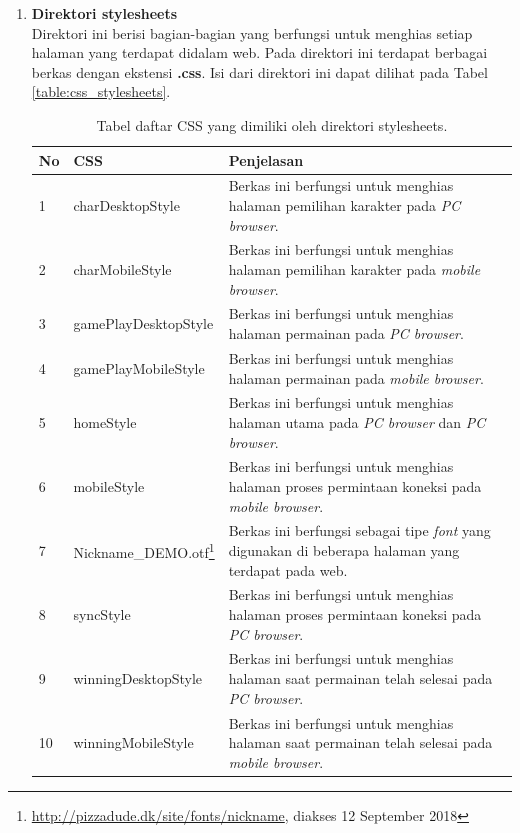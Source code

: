 \begin{enumerate}
\begin{enumerate}
\begin{enumerate}
		\end{enumerate}
		\item \textbf{Direktori stylesheets} \\ 
		Direktori ini berisi bagian-bagian yang berfungsi untuk menghias setiap halaman yang terdapat didalam web. Pada direktori ini terdapat berbagai berkas dengan ekstensi \textbf{.css}. Isi dari direktori ini dapat dilihat pada Tabel \ref{table:css_stylesheets}.
		\begin{table}[H]
			\centering
			\caption{Tabel daftar CSS yang dimiliki oleh direktori stylesheets.}
			\begin{tabular}{|p{0.35cm}|p{3cm}|p{7cm}|}
				\hline
				No & CSS & Penjelasan \\ \hline
				1 & charDesktopStyle & Berkas ini berfungsi untuk menghias halaman pemilihan karakter pada \textit{PC browser}. \\ \hline
				2 & charMobileStyle & Berkas ini berfungsi untuk menghias halaman pemilihan karakter pada \textit{mobile browser}. \\ \hline
				3 & gamePlayDesktopStyle & Berkas ini berfungsi untuk menghias halaman permainan pada \textit{PC browser}. \\ \hline
				4 & gamePlayMobileStyle & Berkas ini berfungsi untuk menghias halaman permainan pada \textit{mobile browser}. \\ \hline
				5 & homeStyle & Berkas ini berfungsi untuk menghias halaman utama pada \textit{PC browser} dan \textit{PC browser}. \\ \hline
				6 & mobileStyle & Berkas ini berfungsi untuk menghias halaman proses permintaan koneksi pada \textit{mobile browser}. \\ \hline
				7 & Nickname\_DEMO.otf\footnote{\url{http://pizzadude.dk/site/fonts/nickname}, diakses 12 September 2018} & Berkas ini berfungsi sebagai tipe \textit{font} yang digunakan di beberapa halaman yang terdapat pada web. \\ \hline
				8 & syncStyle & Berkas ini berfungsi untuk menghias halaman proses permintaan koneksi pada \textit{PC browser}. \\ \hline
				9 & winningDesktopStyle & Berkas ini berfungsi untuk menghias halaman saat permainan telah selesai pada \textit{PC browser}. \\ \hline
				10 & winningMobileStyle & Berkas ini berfungsi untuk menghias halaman saat permainan telah selesai pada \textit{mobile browser}. \\ \hline

\end{tabular}
\end{table}
\end{enumerate}
\end{enumerate}
